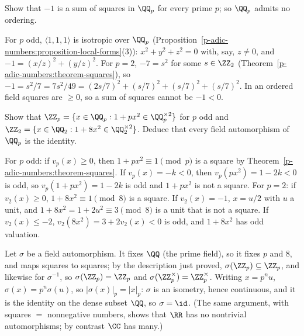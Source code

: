\begin{exercise}\label{p-adic-numbers:exercise-not-ordered}
Show that $-1$ is a sum of squares in $\QQ_p$ for every prime $p$; so $\QQ_p$ admits no ordering.
\end{exercise}

\begin{solution}
For $p$ odd, $\langle 1, 1, 1\rangle$ is isotropic over $\QQ_p$ (Proposition~\ref{p-adic-numbers:proposition-local-forms}(3)): $x^2 + y^2 + z^2 = 0$ with, say, $z \neq 0$, and $-1 = (x/z)^2 + (y/z)^2$. For $p = 2$,
$-7 = s^2$ for some $s \in \ZZ_2$ (Theorem~\ref{p-adic-numbers:theorem-squares}), so $-1 = s^2/7 = 7s^2/49 = (2s/7)^2 + (s/7)^2 + (s/7)^2 + (s/7)^2$. In an ordered field squares are $\geq 0$, so a sum of squares
cannot be $-1 < 0$.
\end{solution}

\begin{exercise}\label{p-adic-numbers:exercise-automorphisms}
Show that $\ZZ_p = \{x \in \QQ_p : 1 + px^2 \in \QQ_p^{\times2}\}$ for $p$ odd and $\ZZ_2 = \{x \in \QQ_2 : 1 + 8x^2 \in \QQ_2^{\times2}\}$. Deduce that every field automorphism of $\QQ_p$ is the identity.
\end{exercise}

\begin{solution}
For $p$ odd: if $v_p(x) \geq 0$, then $1 + px^2 \equiv 1 \pmod p$ is a square by Theorem~\ref{p-adic-numbers:theorem-squares}. If $v_p(x) = -k < 0$, then $v_p(px^2) = 1 - 2k < 0$ is odd, so
$v_p(1 + px^2) = 1 - 2k$ is odd and $1 + px^2$ is not a square. For $p = 2$: if $v_2(x) \geq 0$, $1 + 8x^2 \equiv 1 \pmod 8$ is a square. If $v_2(x) = -1$, $x = u/2$ with $u$ a unit, and $1 + 8x^2 = 1 + 2u^2 \equiv 3 \pmod 8$
is a unit that is not a square. If $v_2(x) \leq -2$, $v_2(8x^2) = 3 + 2v_2(x) < 0$ is odd, and $1 + 8x^2$ has odd valuation.

Let $\sigma$ be a field automorphism. It fixes $\QQ$ (the prime field), so it fixes $p$ and $8$, and maps squares to squares; by the description just proved, $\sigma(\ZZ_p) \subseteq \ZZ_p$, and likewise for $\sigma^{-1}$, so
$\sigma(\ZZ_p) = \ZZ_p$ and $\sigma(\ZZ_p^\times) = \ZZ_p^\times$. Writing $x = p^nu$, $\sigma(x) = p^n\sigma(u)$, so $|\sigma(x)|_p = |x|_p$: $\sigma$ is an isometry, hence continuous, and it is the identity on the dense subset
$\QQ$, so $\sigma = \id$. (The same argument, with squares $=$ nonnegative numbers, shows that $\RR$ has no nontrivial automorphisms; by contrast $\CC$ has many.)
\end{solution}

